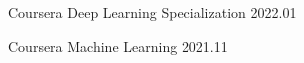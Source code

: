 




\begin{cvhonors}


\cvhonor
{Coursera} %
{Deep Learning Specialization} %
{} %
{2022.01} %


\cvhonor
{Coursera} %
{Machine Learning} %
{} %
{2021.11} %


\end{cvhonors}

